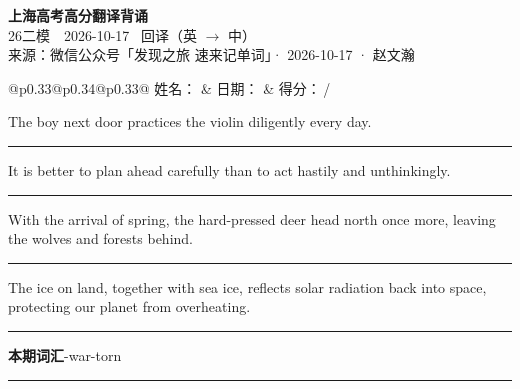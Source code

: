 \documentclass[11pt,a4paper]{article}
\newcommand{\num}[1]{\makebox[1.9em][r]{#1.}\hspace{0.3em}}
\newcommand{\wline}{\noindent\rule{\linewidth}{0.4pt}}
\begin{document}
\pagestyle{plain}
\begin{center}
{\LARGE\bfseries 上海高考高分翻译背诵 }\\[0.25em]
{\large 26二模　2026-10-17 \quad\ 回译（英 $\to$ 中）}\\[0.35em]
{\footnotesize 来源：微信公众号「发现之旅 速来记单词」· 2026-10-17 · 赵文瀚}
\end{center}

\vspace{0.4em}
\noindent\begin{tabular}{@{}p{0.33\textwidth}@{}p{0.34\textwidth}@{}p{0.33\textwidth}@{}}
姓名：\underline{\hspace{2.0cm}} & 日期：\underline{\hspace{2.0cm}} & 得分：\underline{\hspace{1.4cm}}\,/ \\
\end{tabular}

\vspace{0.5em}

\vspace{0.8em}
\num{1}The boy next door practices the violin diligently every day.

\vspace{0.25em}

\wline

\num{2}It is better to plan ahead carefully than to act hastily and unthinkingly.

\vspace{0.25em}

\wline

\num{3}With the arrival of spring, the hard-pressed deer head north once more, leaving the wolves and forests behind.

\vspace{0.25em}

\wline

\num{4}The ice on land, together with sea ice, reflects solar radiation back into space, protecting our planet from overheating.

\vspace{0.25em}

\wline

\vspace{0.4em}\noindent{\color{rulegray}\rule{\textwidth}{0.6pt}}\vspace{0.4em}

\num{5}\textbf{本期词汇}\quad -war-torn

\vspace{0.25em}

\wline
\end{document}
